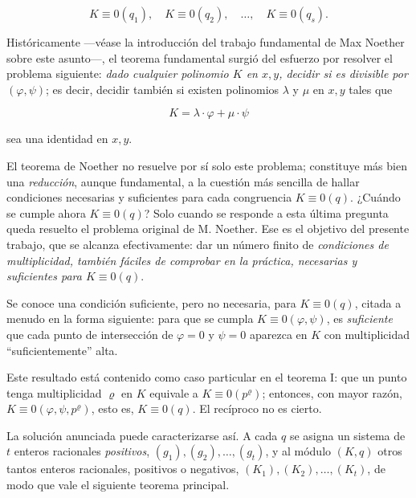 \[
K\equiv0(q_1),\quad K\equiv0(q_2),\quad\ldots,\quad K\equiv0(q_s).
\]

Históricamente ---véase la introducción del trabajo fundamental de Max Noether sobre este asunto---, el teorema fundamental surgió del esfuerzo por resolver el problema siguiente: \emph{dado cualquier polinomio $K$ en $x,y$, decidir si es divisible por $(\varphi,\psi)$}; es decir, decidir también si existen polinomios $\lambda$ y $\mu$ en $x,y$ tales que

\[
K=\lambda\cdot\varphi+\mu\cdot\psi
\]

sea una identidad en $x,y$.

El teorema de Noether no resuelve por sí solo este problema; constituye más bien una \emph{reducción}, aunque fundamental, a la cuestión más sencilla de hallar condiciones necesarias y suficientes para cada congruencia $K\equiv0(q)$. ¿Cuándo se cumple ahora $K\equiv0(q)$? Solo cuando se responde a esta última pregunta queda resuelto el problema original de M. Noether. Ese es el objetivo del presente trabajo, que se alcanza efectivamente: dar un número finito de \emph{condiciones de multiplicidad, también fáciles de comprobar en la práctica, necesarias y suficientes para $K\equiv0(q)$}.

Se conoce una condición suficiente, pero no necesaria, para $K\equiv0(q)$, citada a menudo en la forma siguiente: para que se cumpla $K\equiv0(\varphi,\psi)$, es \emph{suficiente} que cada punto de intersección de $\varphi=0$ y $\psi=0$ aparezca en $K$ con multiplicidad ``suficientemente'' alta.

Este resultado está contenido como caso particular en el teorema I: que un punto tenga multiplicidad $\varrho$ en $K$ equivale a $K\equiv0(p^\varrho)$; entonces, con mayor razón, $K\equiv0(\varphi,\psi,p^\varrho)$, esto es, $K\equiv0(q)$. El recíproco no es cierto.

La solución anunciada puede caracterizarse así. A cada $q$ se asigna un sistema de $t$ enteros racionales \emph{positivos}, $(g_1),(g_2),\ldots,(g_t)$, y al módulo $(K,q)$ otros tantos enteros racionales, positivos o negativos, $(K_1),(K_2),\ldots,(K_t)$, de modo que vale el siguiente teorema principal.


